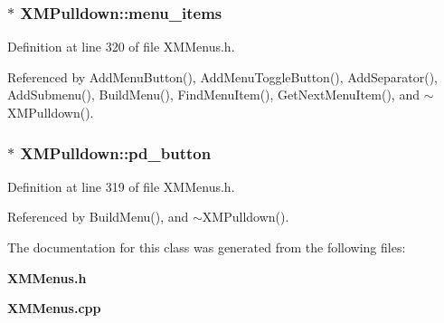 \subsubsection{$\ast$ XMPulldown::menu\_\-items\hspace{0.3cm}{\tt  [protected]}}\label{classXMPulldown_n1}




Definition at line 320 of file XMMenus.h.

Referenced by Add\-Menu\-Button(), Add\-Menu\-Toggle\-Button(), Add\-Separator(), Add\-Submenu(), Build\-Menu(), Find\-Menu\-Item(), Get\-Next\-Menu\-Item(), and $\sim$XMPulldown().
\subsubsection{$\ast$ XMPulldown::pd\_\-button\hspace{0.3cm}{\tt  [protected]}}\label{classXMPulldown_n0}




Definition at line 319 of file XMMenus.h.

Referenced by Build\-Menu(), and $\sim$XMPulldown().

The documentation for this class was generated from the following files:\begin{CompactItemize}
\item 
{\bf XMMenus.h}\item 
{\bf XMMenus.cpp}\end{CompactItemize}
